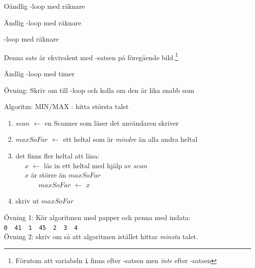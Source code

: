 \documentclass{lecturenotes}
\begin{document}
\begin{Slide}{Oändlig -loop med räknare}

\end{Slide}

\begin{Slide}{Ändlig -loop med räknare}

\end{Slide}


\begin{Slide}{-loop med räknare}

Denna sats är ekvivalent med -satsen på föregående bild.\footnote{\scriptsize Förutom att variabeln \texttt{i} finns efter -satsen men \textit{inte} efter -satsen }
\end{Slide}

\begin{Slide}{Ändlig -loop med timer}

\scriptsize 
Övning: Skriv om till -loop och kolla om den är lika snabb som 
\end{Slide}

\begin{Slide}{Algoritm: MIN/MAX}
: hitta största talet \\ \vspace{1em}
\pause
{} 
\begin{enumerate}
\item $scan$ $\leftarrow$ en Scanner som läser det användaren skriver
\item $maxSoFar$ $\leftarrow$ ett heltal som är \textit{mindre} än alla andra heltal
\item  {} det finns fler heltal att läsa: \\
~~ $x$ $\leftarrow$ läs in ett heltal med hjälp av $scan$ \\
~~  $x$ är större än $maxSoFar$ \\
~~~~~~ $maxSoFar$ $\leftarrow$ $x$
\item skriv ut $maxSoFar$ 
\end{enumerate}
\vspace{1em} \scriptsize 
Övning 1: Kör algoritmen med papper och penna med indata: \texttt{0~~41~~1~~45~~2~~3~~4}\\ 
Övning 2: skriv om så att algoritmen istället hittar \textit{minsta} talet.
\end{Slide}
\end{document}
